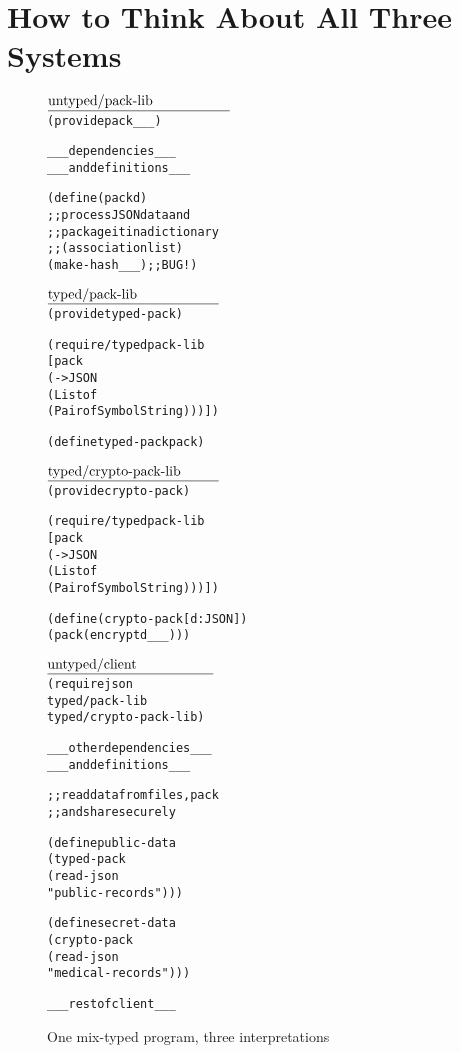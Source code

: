 \section{How to Think About All Three Systems} 
\label{sec:landscape}


\def\fname#1#2{$\underline{\hbox to #2in{#1}}$\\[-2ex]}

\begin{figure*}[hbt]\footnotesize
  \vspace{-1mm}

\begin{minipage}[t]{2.2in}
\begin{alltt}\fname{untyped/pack-lib}{1.8}
(provide pack _ _ _)

_ _ _  dependencies     _ _ _
_ _ _  and definitions  _ _ _

(define (pack d)
  ;; process JSON data and 
  ;; package it in a dictionary
  ;; (association list)
  (make-hash _ _ _) ;; BUG!)


\end{alltt}
\end{minipage}\begin{minipage}[t]{2.2in}
\begin{alltt}\fname{typed/pack-lib}{1.7}
(provide typed-pack)

(require/typed pack-lib
  [pack 
  (-> JSON 
      (Listof 
       (Pairof Symbol String)))])

(define typed-pack pack) 
\end{alltt}
\smallskip
\begin{alltt}\fname{typed/crypto-pack-lib}{1.7}
(provide crypto-pack) 

(require/typed pack-lib
 [pack 
  (-> JSON 
      (Listof 
       (Pairof Symbol String)))])

(define (crypto-pack [d : JSON])
  (pack (encrypt d _ _ _)))

 \end{alltt}
\end{minipage}\begin{minipage}[t]{2.2in}
\begin{alltt}\fname{untyped/client}{1.65}
(require json 
         typed/pack-lib
           typed/crypto-pack-lib)

_ _ _  other dependencies  _ _ _
_ _ _  and definitions     _ _ _
          
;; read data from files, pack 
;; and share securely 

(define public-data 
  (typed-pack 
   (read-json 
    "public-records")))

(define secret-data 
  (crypto-pack 
   (read-json 
    "medical-records")))
 
 _ _ _ rest of client _ _ _
\end{alltt}\end{minipage}

   \caption{One mix-typed program, three interpretations} \label{fig:example}

  \vspace{-1mm}
\end{figure*}
